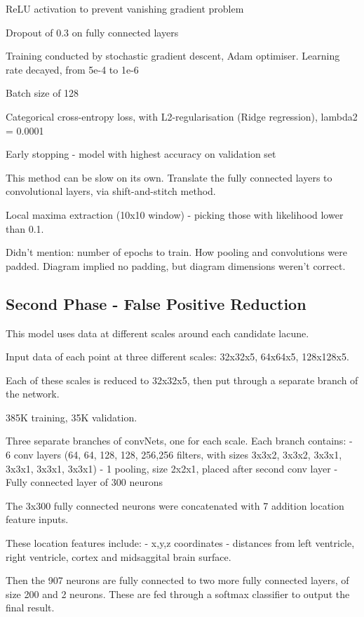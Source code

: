 ReLU activation to prevent vanishing gradient problem

Dropout of 0.3 on fully connected layers

Training conducted by stochastic gradient descent, Adam optimiser. Learning rate decayed, from 5e-4 to 1e-6

Batch size of 128

Categorical cross-entropy loss, with L2-regularisation (Ridge regression), lambda2 = 0.0001

Early stopping - model with highest accuracy on validation set


This method can be slow on its own. Translate the fully connected layers to convolutional layers, via shift-and-stitch method.

Local maxima extraction (10x10 window) - picking those with likelihood lower than 0.1.


Didn't mention: number of epochs to train. How pooling and convolutions were padded. Diagram implied no padding, but diagram dimensions weren't correct. 

\subsection{Second Phase - False Positive Reduction}

This model uses data at different scales around each candidate lacune. 

Input data of each point at three different scales: 32x32x5, 64x64x5, 128x128x5.

Each of these scales is reduced to 32x32x5, then put through a separate branch of the network.

385K training, 35K validation.

Three separate branches of convNets, one for each scale. Each branch contains:
 - 6 conv layers (64, 64, 128, 128, 256,256 filters, with sizes 3x3x2, 3x3x2, 3x3x1, 3x3x1, 3x3x1, 3x3x1)
 - 1 pooling, size 2x2x1, placed after second conv layer
 - Fully connected layer of 300 neurons
 
 The 3x300 fully connected neurons were concatenated with 7 addition location feature inputs.
 
 These location features include:
  - x,y,z coordinates
  - distances from left ventricle, right ventricle, cortex and midsaggital brain surface.

Then the 907 neurons are fully connected to two more fully connected layers, of size 200 and 2 neurons. 
These are fed through a softmax classifier to output the final result.

